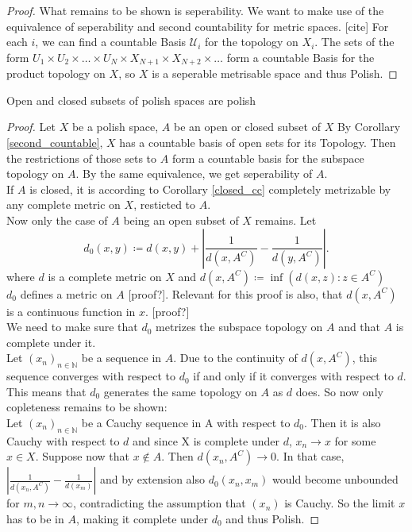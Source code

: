 \documentclass[10pt, a4paper, titlepage]{article}
\numberwithin{equation}{section}
\begin{document}
\begin{proof}
What remains to be shown is seperability. We want to make use of the equivalence of seperability and second countability for metric spaces. [cite]
For each $i$, we can find a countable Basis  $\mathcal{U}_i$ for the topology on $X_i$.
The sets of the form $U_1 \times U_2 \times \ldots \times U_N \times X_{N+1} \times X_{N+2} \times \ldots$ form a countable Basis for the product topology on $X$, 
so  $X$ is a seperable metrisable space and thus Polish.

\end{proof}

\begin{corollary}
	Open and closed subsets of polish spaces are polish
\end{corollary}


\begin{proof}
	Let $X$ be a polish space, $A$ be an open or closed subset of $X$
	By Corollary \ref{second_countable}, $X$ has a countable basis of open sets for its Topology. Then the restrictions of those sets to  $A$ form  a countable basis for the subspace topology on $A$. 
By the same equivalence, we get seperability of  $A$.\\
If $A$ is closed, it is according to Corollary \ref{closed_cc} completely metrizable by any complete metric on $X$, resticted to  $A$.\\
Now only the case of  $A$ being an open subset of  $X$ remains.
Let  \[
d_0 \left( x,y \right)  \coloneq d\left( x,y \right) + \left| \frac{1}{d\left( x,A^{C} \right) } - \frac{1}{d\left( y,A^C \right) } \right| 
.\]
where $d$ is a complete metric on  $X$ and  $d\left( x,A^C \right)  \coloneq \inf\left( d\left( x,z \right): z \in A^C \right)  $\\
$d_0$ defines a metric on $A$ [proof?]. Relevant for this proof is also, that $d\left( x,A^C \right) $ is a continuous function in $x$. [proof?]\\
We need to make sure that $d_0$ metrizes the subspace topology on $A$ and that  $A$ is complete under it.\\
Let $\left( x_{n} \right)_{n \in \mathbb{N}}$ be a sequence in $A$. Due to the continuity of  $d\left( x,A^C \right) $, this sequence converges with respect to $d_0$ if and only if it converges with respect to $d$. This means that $d_0$ generates the same topology on $A$ as  $d$ does. So now only copleteness remains to be shown: \\
Let $(x_{n})_{n \in  \mathbb{N}} $ be a Cauchy sequence in A with respect to $d_0$. Then it is also Cauchy with respect to $d$ and since X is complete under  $d$, $x_{n} \to x$ for some $x \in X$. 
Suppose now that $x \notin A$. Then  $d\left( x_{n},A^{C} \right) \to 0$. In that case, $\left| \frac{1}{d\left( x_{n},A^C \right) }- \frac{1}{d\left( x_m \right) } \right| $ and by extension also $d_0\left( x_{n},x_m \right) $ would become unbounded for $m,n \to \infty$, contradicting the assumption that $\left( x_{n} \right) $ is Cauchy. 
So the limit $x$ has to be in  $A$, making it complete under $d_0$ and thus Polish. 
\end{proof}
\end{document}

